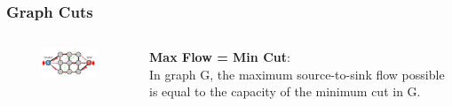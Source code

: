 \documentclass[notheorems,mathserif,table,compress]{beamer}  %
\begin{document}
\begin{frame}
\frametitle{Graph Cuts}
\begin{columns}
\begin{column}[c]{0.5\textwidth}
       \begin{figure}[!ht]
       \centering
       \includegraphics[width=1.9in]{maxflow3.png}
       \end{figure}
\end{column}

\begin{column}[c]{0.5\textwidth}
\textbf{Max Flow = Min Cut}:\\
In graph G, the {\color{blue} maximum source-to-sink flow} possible is equal to the capacity of the {\color{blue} minimum cut} in G.
    \end{column}
 \end{columns}  
\end{frame}
\end{document}
